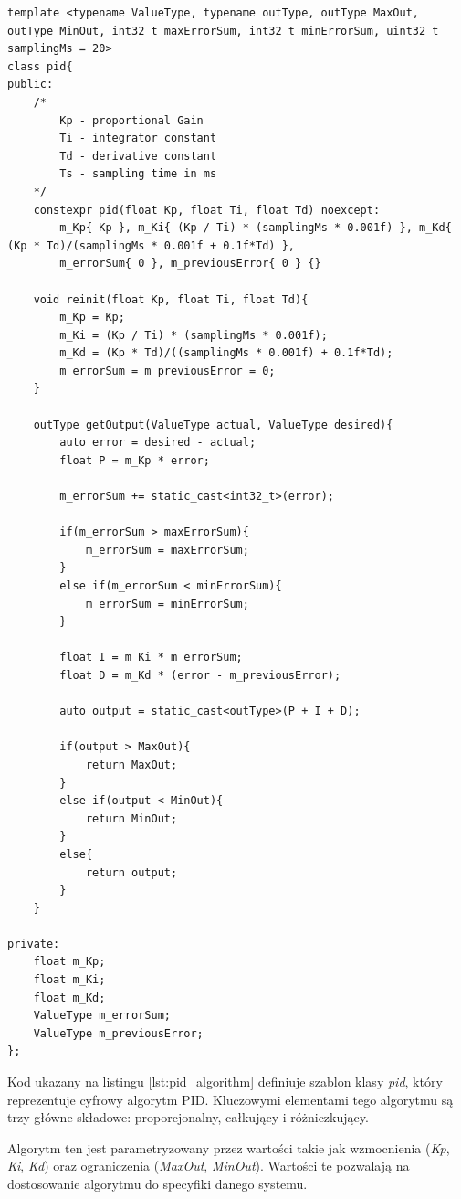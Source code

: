 \documentclass[12pt,twoside]{article}
\begin{document}
\begin{lstlisting}[caption={Kod implementacji cyfrowego algorytmu PID}, label={lst:pid_algorithm}]
template <typename ValueType, typename outType, outType MaxOut, outType MinOut, int32_t maxErrorSum, int32_t minErrorSum, uint32_t samplingMs = 20>
class pid{
public:
    /*
        Kp - proportional Gain
        Ti - integrator constant
        Td - derivative constant
        Ts - sampling time in ms
    */
    constexpr pid(float Kp, float Ti, float Td) noexcept:
        m_Kp{ Kp }, m_Ki{ (Kp / Ti) * (samplingMs * 0.001f) }, m_Kd{ (Kp * Td)/(samplingMs * 0.001f + 0.1f*Td) },
        m_errorSum{ 0 }, m_previousError{ 0 } {}
    
    void reinit(float Kp, float Ti, float Td){
        m_Kp = Kp;
        m_Ki = (Kp / Ti) * (samplingMs * 0.001f);
        m_Kd = (Kp * Td)/((samplingMs * 0.001f) + 0.1f*Td);
        m_errorSum = m_previousError = 0;
    }

    outType getOutput(ValueType actual, ValueType desired){
        auto error = desired - actual;
        float P = m_Kp * error;
        
        m_errorSum += static_cast<int32_t>(error);

        if(m_errorSum > maxErrorSum){
            m_errorSum = maxErrorSum;
        }
        else if(m_errorSum < minErrorSum){
            m_errorSum = minErrorSum; 
        }

        float I = m_Ki * m_errorSum;
        float D = m_Kd * (error - m_previousError);

        auto output = static_cast<outType>(P + I + D);

        if(output > MaxOut){
            return MaxOut;
        }
        else if(output < MinOut){
            return MinOut;
        }
        else{
            return output;
        }
    }

private:
    float m_Kp;
    float m_Ki;
    float m_Kd;
    ValueType m_errorSum;
    ValueType m_previousError;
};
\end{lstlisting}

Kod ukazany na listingu \ref{lst:pid_algorithm} definiuje szablon klasy \textit{pid}, który reprezentuje cyfrowy algorytm PID. Kluczowymi elementami tego algorytmu są trzy główne składowe: proporcjonalny, całkujący i różniczkujący.

Algorytm ten jest parametryzowany przez wartości takie jak wzmocnienia (\textit{Kp}, \textit{Ki}, \textit{Kd}) oraz ograniczenia (\textit{MaxOut}, \textit{MinOut}). Wartości te pozwalają na dostosowanie algorytmu do specyfiki danego systemu.
\end{document}
